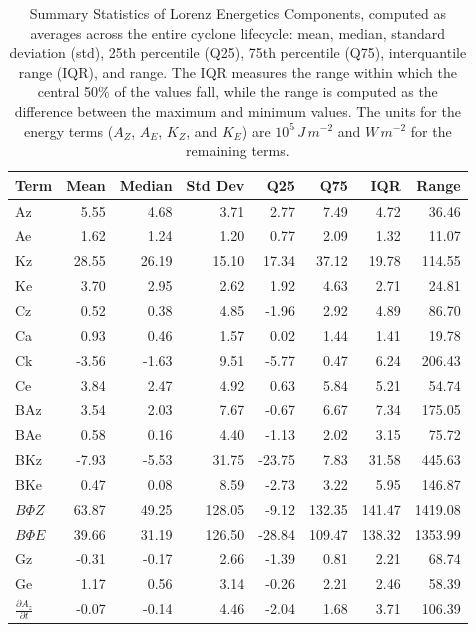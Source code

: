 \documentclass[pdflatex,sn-chicago]{sn-jnl}%
\theoremstyle{plain}
\theoremstyle{definition}
\theoremstyle{remark}
\theoremstyle{definition}
\begin{document}
\begin{table}[!htbp]
\centering
\caption[Summary Statistics of Lorenz Energetics Components]{Summary Statistics of Lorenz Energetics Components, computed as averages across the entire cyclone lifecycle: mean, median, standard deviation (std), 25th percentile (Q25), 75th percentile (Q75), interquantile range (IQR), and range. The IQR measures the range within which the central 50\% of the values fall, while the range is computed as the difference between the maximum and minimum values. The units for the energy terms ($A_Z$, $A_E$, $K_Z$, and $K_E$) are $10^5 \, J \, m^{-2}$ and $W \, m^{-2}$ for the remaining terms.}
\label{tab:lec_stats}
\begin{tabular}{lrrrrrrr}
\toprule
Term & Mean & Median & Std Dev & Q25 & Q75 & IQR & Range \\
\midrule
Az & 5.55 & 4.68 & 3.71 & 2.77 & 7.49 & 4.72 & 36.46 \\
Ae & 1.62 & 1.24 & 1.20 & 0.77 & 2.09 & 1.32 & 11.07 \\
Kz & 28.55 & 26.19 & 15.10 & 17.34 & 37.12 & 19.78 & 114.55 \\
Ke & 3.70 & 2.95 & 2.62 & 1.92 & 4.63 & 2.71 & 24.81 \\
Cz & 0.52 & 0.38 & 4.85 & -1.96 & 2.92 & 4.89 & 86.70 \\
Ca & 0.93 & 0.46 & 1.57 & 0.02 & 1.44 & 1.41 & 19.78 \\
Ck & -3.56 & -1.63 & 9.51 & -5.77 & 0.47 & 6.24 & 206.43 \\
Ce & 3.84 & 2.47 & 4.92 & 0.63 & 5.84 & 5.21 & 54.74 \\
BAz & 3.54 & 2.03 & 7.67 & -0.67 & 6.67 & 7.34 & 175.05 \\
BAe & 0.58 & 0.16 & 4.40 & -1.13 & 2.02 & 3.15 & 75.72 \\
BKz & -7.93 & -5.53 & 31.75 & -23.75 & 7.83 & 31.58 & 445.63 \\
BKe & 0.47 & 0.08 & 8.59 & -2.73 & 3.22 & 5.95 & 146.87 \\
$B\Phi Z$ & 63.87 & 49.25 & 128.05 & -9.12 & 132.35 & 141.47 & 1419.08 \\
$B\Phi E$ & 39.66 & 31.19 & 126.50 & -28.84 & 109.47 & 138.32 & 1353.99 \\
Gz & -0.31 & -0.17 & 2.66 & -1.39 & 0.81 & 2.21 & 68.74 \\
Ge & 1.17 & 0.56 & 3.14 & -0.26 & 2.21 & 2.46 & 58.39 \\
$\frac{\partial A_z}{\partial t}$ & -0.07 & -0.14 & 4.46 & -2.04 & 1.68 & 3.71 & 106.39 \\

\end{tabular}
\end{table}
\end{document}
